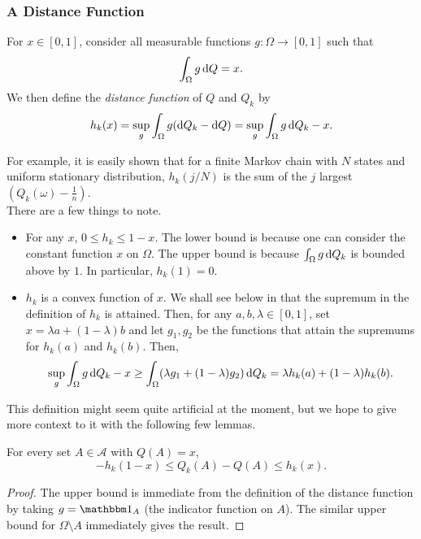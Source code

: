 \subsubsection{A Distance Function}

\begin{fdef}
For $x\in[0,1]$, consider all measurable functions $g:\Omega\to[0,1]$ such that
\[ \int_{\Omega} g\operatorname{d}\!{Q} = x. \]
We then define the \textit{distance function} of $Q$ and $Q_k$ by
\[ h_k(x) = \sup_g \int_\Omega g(\operatorname{d}\!{Q}_k-\operatorname{d}\!{Q}) = \sup_g \int_\Omega g\operatorname{d}\!{Q}_k - x. \]
\end{fdef}

For example, it is easily shown that for a finite Markov chain with $N$ states and uniform stationary distribution, $h_k(j/N)$ is the sum of the $j$ largest $\left(Q_k(\omega)-\frac{1}{n}\right)$.\\

There are a few things to note.
\begin{itemize}
    \item For any $x$, $0\leq h_k\leq 1-x$. The lower bound is because one can consider the constant function $x$ on $\Omega$. The upper bound is because $\int_\Omega g\operatorname{d}\!{Q}_k$ is bounded above by $1$. In particular, $h_k(1)=0$.
    \item $h_k$ is a convex function of $x$. We shall see below in  that the supremum in the definition of $h_k$ is attained. Then, for any $a,b,\lambda\in[0,1]$, set $x=\lambda a+(1-\lambda)b$ and let $g_1,g_2$ be the functions that attain the supremums for $h_k(a)$ and $h_k(b)$. Then,
    \[ \sup_g \int_\Omega g\operatorname{d}\!{Q}_k - x \geq \int_\Omega (\lambda g_1 + (1-\lambda)g_2) \operatorname{d}\!{Q}_k = \lambda h_k(a) + (1-\lambda) h_k(b). \]
\end{itemize}

This definition might seem quite artificial at the moment, but we hope to give more context to it with the following few lemmas.

\begin{lemma}
For every set $A\in\mathcal{A}$ with $Q(A)=x$,
\[ -h_k(1-x) \leq Q_k(A) - Q(A) \leq h_k(x). \]
\end{lemma}
\begin{proof}
The upper bound is immediate from the definition of the distance function by taking $g = \indic_A$ (the indicator function on $A$). The similar upper bound for $\Omega\setminus A$ immediately gives the result.
\end{proof}

